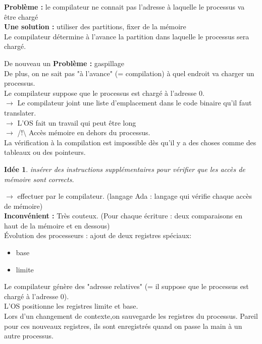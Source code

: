 \documentclass[12pt,a4paper]{report}
\newtheorem*{id}{Idée}
\begin{document}
\textbf{Problème :} le compilateur ne connait pas l'adresse à laquelle le processus va être chargé\\

\textbf{Une solution :} utiliser des partitions, fixer de la mémoire\\
Le compilateur détermine à l'avance la partition dans laquelle le processus sera chargé.

De nouveau un
\textbf{Problème :} gaspillage\\
De plus, on ne sait pas "à l'avance" (= compilation) à quel endroit va charger un processus.\\

Le compilateur suppose que le processus est chargé à l'adresse 0.\\
$\rightarrow$ Le compilateur joint une liste d'emplacement dans le code binaire qu'il faut translater.\\
$\rightarrow$ L'OS fait un travail qui peut être long\\
$\rightarrow$ /!$\setminus$ Accès mémoire en dehors du processus.\\
La vérification à la compilation est impossible dès qu'il y a des choses comme des tableaux ou des pointeurs.\\

\begin{id}insérer des instructions supplémentaires pour vérifier que les accès de mémoire sont corrects.\end{id}
$\rightarrow$ effectuer par le compilateur. (langage Ada : langage qui vérifie chaque accès de mémoire)\\
\textbf{Inconvénient :} Très couteux. (Pour chaque écriture : deux comparaisons en haut de la mémoire et en dessous)\\

Évolution des processeurs :
ajout de deux registres spéciaux:
\begin{itemize}
\item base
\item limite
\end{itemize}
Le compilateur génère des "adresse relatives" (= il suppose que le processus est chargé à l'adresse 0).\\
L'OS positionne les registres limite et base.\\

Lors d'un changement de contexte,on sauvegarde les registres du processus. Pareil pour ces nouveaux registres, ils sont enregistrés quand on passe la main à un autre processus.
\end{document}
